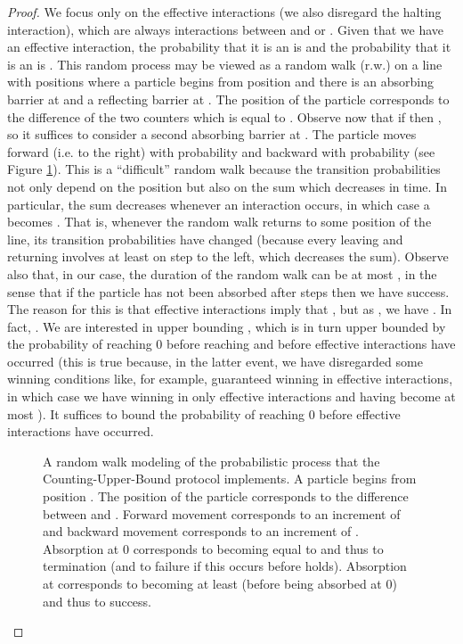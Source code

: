\documentclass[oribibl, 11pt]{llncs}
\begin{document}
\begin{proof}
We focus only on the effective interactions (we also disregard the halting interaction), which are always interactions between  and  or . Given that we have an effective interaction, the probability that it is an  is  and the probability that it is an  is . This random process may be viewed as a random walk (r.w.) on a line with  positions  where a particle begins from position  and there is an absorbing barrier at  and a reflecting barrier at . The position of the particle corresponds to the difference  of the two counters which is equal to . Observe now that if  then , so it suffices to consider a second absorbing barrier at . The particle moves forward (i.e. to the right) with probability  and backward with probability  (see Figure \ref{fig:random-walk-ij}). This is a ``difficult'' random walk because the transition probabilities not only depend on the position  but also on the sum  which decreases in time. In particular, the sum decreases whenever an  interaction occurs, in which case a  becomes . That is, whenever the random walk returns to some position  of the line, its transition probabilities have changed (because every leaving and returning involves at least on step to the left, which decreases the sum). Observe also that, in our case, the duration of the random walk can be at most , in the sense that if the particle has not been absorbed after  steps then we have success. The reason for this is that  effective interactions imply that , but as , we have . In fact,  . We are interested in upper bounding , which is in turn upper bounded by the probability of reaching 0 before reaching  and before  effective interactions have occurred (this is true because, in the latter event, we have disregarded some winning conditions like, for example, guaranteed winning in  effective interactions, in which case we have winning in only  effective interactions and  having become at most ). It suffices to bound the probability of reaching 0 before  effective interactions have occurred.

\begin{figure}[!hbtp]
\caption{A random walk modeling of the probabilistic process that the Counting-Upper-Bound protocol implements. A particle begins from position . The position  of the particle corresponds to the difference between  and . Forward movement corresponds to an increment of  and backward movement corresponds to an increment of . Absorption at 0 corresponds to  becoming equal to  and thus to termination (and to failure if this occurs before  holds). Absorption at  corresponds to  becoming at least  (before being absorbed at 0) and thus to success.} \label{fig:random-walk-ij}
\end{figure}


\end{proof}
\end{document}
